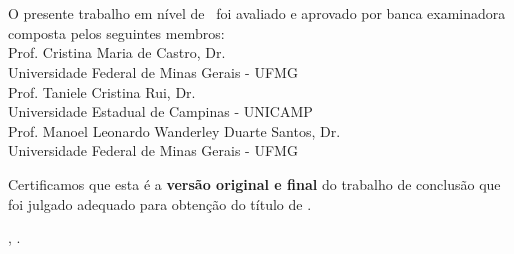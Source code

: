 \documentclass[
	12pt,				%
	oneside,			%
	a4paper,			%
	sumario=tradicional,
	english,			%
	brazil				%
	]{abntex2}
\begin{document}
\begin{folhadeaprovacao}
	\OnehalfSpacing
	\centering
	\imprimirautor\\%
	\vspace*{10pt}		
	\textbf{\imprimirtitulo}%
	\ifnotempty{\imprimirsubtitulo}{:~\imprimirsubtitulo}\\%
	\vspace*{\baselineskip}
	O presente trabalho em nível de \imprimirnivel~foi avaliado e aprovado por banca examinadora composta pelos seguintes membros:\\
	\vspace*{\baselineskip}
    Prof\textordfeminine. Cristina Maria de Castro, Dr\textordfeminine.\\
  Universidade Federal de Minas Gerais - UFMG\\
  \vspace*{\baselineskip}
    Prof\textordfeminine. Taniele Cristina Rui, Dr\textordfeminine.\\
  Universidade Estadual de Campinas - UNICAMP\\
  \vspace*{\baselineskip}
    Prof. Manoel Leonardo Wanderley Duarte Santos, Dr.\\
  Universidade Federal de Minas Gerais - UFMG\\
  \vspace*{\baselineskip}
    
	\vspace*{2\baselineskip}
	\begin{minipage}{\textwidth}
		Certificamos que esta é a \textbf{versão original e final} do trabalho de conclusão que foi julgado adequado para obtenção do título de \imprimirformacao.\\
	\end{minipage}
	\vspace*{\fill}
	\vspace*{\fill}
	\assinatura{\OnehalfSpacing\imprimirorientador \\ \imprimirorientadorRotulo}
	\vspace*{\fill}
	\imprimirlocal, \imprimirano.
\end{folhadeaprovacao}
\end{document}
